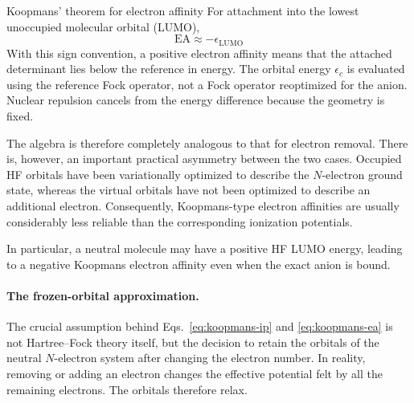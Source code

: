 \documentclass[11pt,a4paper,titlepage]{article}
\numberwithin{equation}{section}
\begin{document}
\begin{hfsolution}{Koopmans' theorem for electron affinity}
For attachment into the lowest unoccupied molecular orbital (LUMO),
\begin{equation}
  \text{EA}
  \approx
  -\epsilon_\text{LUMO}
\end{equation}
With this sign convention, a positive electron affinity means that the
attached determinant lies below the reference in energy. The orbital
energy $\epsilon_c$ is evaluated using the reference Fock operator, not a
Fock operator reoptimized for the anion. Nuclear repulsion cancels from
the energy difference because the geometry is fixed.

The algebra is therefore completely analogous to that for electron
removal. There is, however, an important practical asymmetry between the
two cases. Occupied HF orbitals have been variationally optimized to
describe the $N$-electron ground state, whereas the virtual orbitals have
not been optimized to describe an additional electron. Consequently,
Koopmans-type electron affinities are usually considerably less reliable
than the corresponding ionization potentials.

In particular, a neutral molecule may have a positive HF LUMO energy,
leading to a negative Koopmans electron affinity even when the exact anion
is bound.

\end{hfsolution}


\paragraph{The frozen-orbital approximation.}

The crucial assumption behind Eqs.~\eqref{eq:koopmans-ip} and
\eqref{eq:koopmans-ea} is not Hartree--Fock theory itself, but the decision
to retain the orbitals of the neutral $N$-electron system after changing
the electron number.
In reality, removing or adding an electron changes the effective potential
felt by all the remaining electrons. The orbitals therefore relax.
\end{document}
